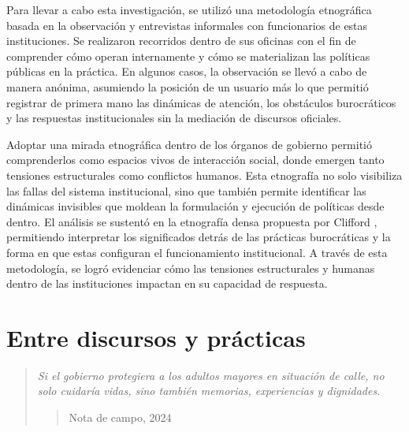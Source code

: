 \documentclass[
  spanish,
  11pt,
  a4paper,
]{scrbook}
\begin{document}
Para llevar a cabo esta investigación, se utilizó una metodología
etnográfica basada en la observación y entrevistas informales con
funcionarios de estas instituciones. Se realizaron recorridos dentro de
sus oficinas con el fin de comprender cómo operan internamente y cómo se
materializan las políticas públicas en la práctica. En algunos casos, la
observación se llevó a cabo de manera anónima, asumiendo la posición de
un usuario más lo que permitió registrar de primera mano las dinámicas
de atención, los obstáculos burocráticos y las respuestas
institucionales sin la mediación de discursos oficiales.

Adoptar una mirada etnográfica dentro de los órganos de gobierno
permitió comprenderlos como espacios vivos de interacción social, donde
emergen tanto tensiones estructurales como conflictos humanos. Esta
etnografía no solo visibiliza las fallas del sistema institucional, sino
que también permite identificar las dinámicas invisibles que moldean la
formulación y ejecución de políticas desde dentro. El análisis se
sustentó en la etnografía densa propuesta por Clifford
\textcite{Geertz1973}, permitiendo interpretar los significados detrás
de las prácticas burocráticas y la forma en que estas configuran el
funcionamiento institucional. A través de esta metodología, se logró
evidenciar cómo las tensiones estructurales y humanas dentro de las
instituciones impactan en su capacidad de respuesta.

\section*{Entre discursos y
prácticas}\label{entre-discursos-y-pruxe1cticas}


\begin{quote}
\emph{Si el gobierno protegiera a los adultos mayores en situación de
calle, no solo cuidaría vidas, sino también memorias, experiencias y
dignidades.}

\begin{quote}
Nota de campo, 2024
\end{quote}
\end{quote}
\end{document}
